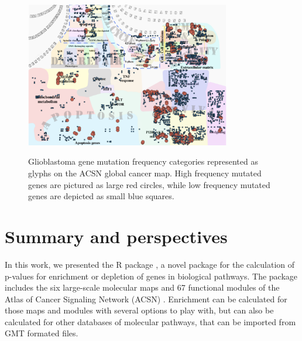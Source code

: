 \begin{figure}[!ht]
  \caption{Glioblastoma gene mutation frequency categories represented as
  glyphs on the ACSN global cancer map. High frequency mutated genes are
  pictured as large red circles, while low frequency mutated genes are depicted
  as small blue squares.
  } 
  \centering
  \includegraphics[width=0.8\textwidth]{figures/gbm.pdf}
  \label{fig:gbm}
\end{figure}

\section[Summary and perspectives]{Summary and perspectives}

In this work, we presented the R package , a novel package for
the calculation of p-values for enrichment or depletion of genes in biological
pathways. The package includes the six large-scale molecular maps and 67
functional modules of the Atlas of Cancer Signaling Network (ACSN) . Enrichment
can be calculated for those maps and modules with several options to play with,
but can also be calculated for other databases of molecular pathways, that can
be imported from GMT formated files. 


